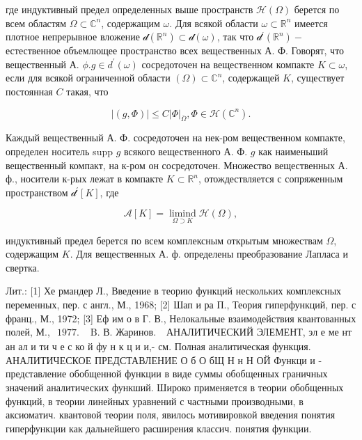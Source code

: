 \documentclass[10pt]{article}
\begin{document}
где индуктивный предел определенных выше пространств $\mathscr{H}(\Omega)$ берется по всем областям $\Omega \subset \mathbb{C}^{n}$, содержащим $\omega$. Для всякой области $\omega \subset \mathbb{R}^{n}$ имеется плотное непрерывное вложение $\mathscr{d}\left(\mathbb{R}^{n}\right) \subset \mathscr{d}(\omega)$, так что $\mathscr{d}^{\prime}\left(\mathbb{R}^{n}\right)-$ естественное объемлющее пространство всех вещественных А. Ф. Говорят, что вещественный А. $\phi . g \in d^{\prime}(\omega)$ сосредоточен на вещественном компакте $K \subset \omega$, если для всякой ограниченной области $(\Omega) \subset \mathbb{C}^{n}$, содержащей $K$, существует постоянная $C$ такая, что



\[

|(g, \Phi)| \leqslant C|\Phi|_{\bar{\Omega}}, \Phi \in \mathscr{H}\left(\mathbb{C}^{n}\right) .

\]



Каждый вещественный А. Ф. сосредоточен на нек-ром вещественном компакте, определен носитель supp $g$ всякого вещественного А. Ф. $g$ как наименьший вещественный компакт, на к-ром он сосредоточен. Множество вещественных А. ф., носители к-рых лежат в компакте $K \subset \mathbb{R}^{n}$, отождествляется с сопряженным пространством $\mathscr{d}^{\prime}[K]$, где



\[

\mathscr{A}[K]=\underset{\Omega \supset K}{\operatorname{limind}} \mathscr{H}(\Omega),

\]



индуктивный предел берется по всем комплексным открытым множествам $\Omega$, содержащим $K$. Для вещественных А. ф. определены преобразование Лапласа и свертка.



Лит.: [1] Хе рмандер Л., Введение в теорию функций нескольких комплексных переменных, пер. с англ., М., 1968; [2] Шап и ра П., Теория гиперфункций, пер. с франц., М., 1972; [3] Еф им о в Г. В., Нелокальные взаимодействия квантованных полей, М., $\begin{array}{ll}1977 . & \text { B. В. Жаринов. }\end{array}$ АНАЛИТИЧЕСКИЙ ЭЛЕМЕНТ, эл е ме нт ан ал и ти ч е с ко й фу н к ц и и,- см. Полная аналитическая функция. АНАЛИТИЧЕСКОЕ ПРЕДСТАВЛЕНИЕ О б О бЩ Н н Н ОЙ Функци и - представление обобщенной функции в виде суммы обобщенных граничных значений аналитических функший. Широко применяется в теории обобщенных функций, в теории линейных уравнений с частными производными, в аксиоматич. квантовой теории поля, явилось мотивировкой введения понятия гиперфункции как дальнейшего расширения классич. понятия функции.
\end{document}
